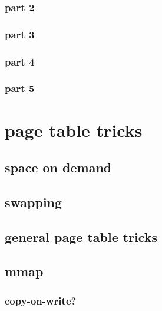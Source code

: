 \subsubsection{part 2}

\subsubsection{part 3}


\subsubsection{part 4}

\subsubsection{part 5}



\section{page table tricks}

\subsection{space on demand}


\subsection{swapping}




\subsection{general page table tricks}



\subsection{mmap}


\subsubsection{copy-on-write?} %


